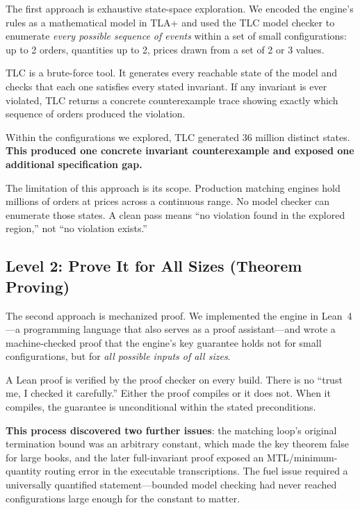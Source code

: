 \documentclass[11pt,a4paper]{article}
\begin{document}
The first approach is exhaustive state-space exploration. We encoded
the engine's rules as a mathematical model in TLA+ and used the TLC
model checker to enumerate \emph{every possible sequence of events}
within a set of small configurations: up to 2 orders, quantities up to
2, prices drawn from a set of 2 or 3 values.

TLC is a brute-force tool. It generates every reachable state of the
model and checks that each one satisfies every stated invariant. If any
invariant is ever violated, TLC returns a concrete counterexample trace
showing exactly which sequence of orders produced the violation.

Within the configurations we explored, TLC generated 36 million
distinct states. \textbf{This produced one concrete invariant
counterexample and exposed one additional specification gap.}

The limitation of this approach is its scope. Production matching
engines hold millions of orders at prices across a continuous range. No
model checker can enumerate those states. A clean pass means ``no
violation found in the explored region,'' not ``no violation exists.''

\subsection{Level 2: Prove It for All Sizes (Theorem Proving)}
\label{sec:overview-lean}

The second approach is mechanized proof. We implemented the engine in
Lean~4---a programming language that also serves as a proof assistant---and
wrote a machine-checked proof that the engine's key guarantee holds not
for small configurations, but for \emph{all possible inputs of all
sizes}.

A Lean proof is verified by the proof checker on every build. There is
no ``trust me, I checked it carefully.'' Either the proof compiles or
it does not. When it compiles, the guarantee is unconditional within
the stated preconditions.

\textbf{This process discovered two further issues}: the matching loop's
original termination bound was an arbitrary constant, which made the
key theorem false for large books, and the later full-invariant proof
exposed an MTL/minimum-quantity routing error in the executable
transcriptions. The fuel issue required a universally quantified
statement---bounded model checking had never reached configurations
large enough for the constant to matter.
\end{document}
